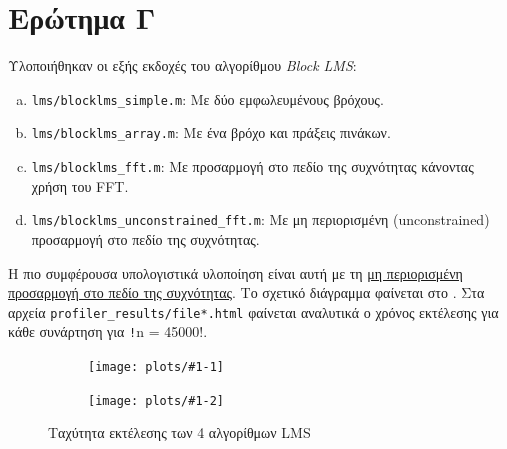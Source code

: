 \newcommand{\dplothere}[2]{%
\begin{figure}[htb]
\centering
\begin{subfigure}{\linewidth}
\centering
    \texttt{[image: plots/\#1-1]}
\end{subfigure}
\par\bigskip %
\begin{subfigure}{\linewidth}
\centering
    \texttt{[image: plots/\#1-2]}
\end{subfigure}
\caption{#2}
\label{fig:#1}%
\end{figure}
}
\section{Ερώτημα Γ}
Υλοποιήθηκαν οι εξής εκδοχές του αλγορίθμου \emph{Block LMS}:
\begin{enumerate}[a)]
\item \label{item:simple}\texttt{lms/blocklms\_simple.m}: Με δύο εμφωλευμένους βρόχους.
\item \label{item:array}\texttt{lms/blocklms\_array.m}: Με ένα βρόχο και πράξεις πινάκων.
\item \label{item:fft}\texttt{lms/blocklms\_fft.m}: Με προσαρμογή στο πεδίο της συχνότητας κάνοντας χρήση του FFT.
\item \label{item:ufft}\texttt{lms/blocklms\_unconstrained\_fft.m}: Με μη περιορισμένη (unconstrained) προσαρμογή στο πεδίο της συχνότητας.
\end{enumerate}

Η πιο συμφέρουσα υπολογιστικά υλοποίηση είναι αυτή με τη
\hyperref[item:ufft]{μη περιορισμένη προσαρμογή στο πεδίο της συχνότητας}.
Το σχετικό διάγραμμα φαίνεται στο .
Στα αρχεία \texttt{profiler\_results/file*.html} φαίνεται αναλυτικά ο χρόνος εκτέλεσης για κάθε συνάρτηση για \texttt!n = 45000!.
\dplothere{performance}{Ταχύτητα εκτέλεσης των 4 αλγορίθμων LMS}

